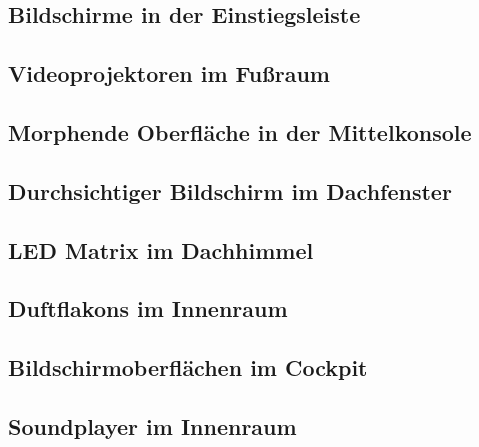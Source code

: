 \subsection{Bildschirme in der Einstiegsleiste}
\subsection{Videoprojektoren im Fußraum}
\subsection{Morphende Oberfläche in der Mittelkonsole}
\subsection{Durchsichtiger Bildschirm im Dachfenster}
\subsection{LED Matrix im Dachhimmel}
\subsection{Duftflakons im Innenraum}
\subsection{Bildschirmoberflächen im Cockpit}
\subsection{Soundplayer im Innenraum}
